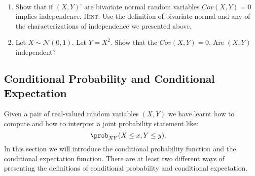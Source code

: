 \documentclass[11pt]{article} %
\begin{document}
\begin{prproblem} \quad \
\begin{enumerate}
\item Show that if $(X,Y)’$ are bivariate normal random variables $Cov(X,Y)=0$ implies independence. {\scshape Hint:} Use the definition of bivariate normal and any of the characterizations of independence we presented above.
\item Let $X \sim \mathcal{N}(0,1)$. Let $Y=X^2$. Show that the $Cov(X,Y) = 0$. Are $(X,Y)$ independent? \end{enumerate}
\end{prproblem}

\newpage








\newpage


\subsection{Conditional Probability and Conditional Expectation}
Given a pair of real-valued random variables $(X, Y)$ we have learnt how to compute and how to interpret a joint probability statement like:
$$\prob_{XY} (X \leq x, Y\leq y).$$ 
In this section we will introduce the conditional probability function and the conditional expectation function. There are at least two different ways of presenting the definitions of conditional probability and conditional expectation.  
\end{document}
